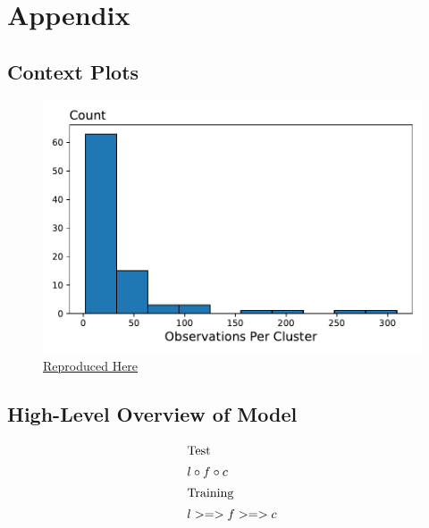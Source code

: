 \documentclass[a4paper,12pt]{article}
\begin{document}
%


\section{Appendix}
\subsection{Context Plots}
\begin{figure}[htbp]
\centering
\includegraphics[width=.5\linewidth]{figures/rtc/results/cceh/cluster_dist_False_False.pdf}
\caption{ \href{https://github.com/pharringtonp19/evictions/blob/main/scripts/cceh/primary/diff_n_mean_rrh.py}{Reproduced Here}}
\label{FIGURE LABEL}
\end{figure}
\subsection{High-Level Overview of Model}
\begin{align*}
\intertext{Test}
    &l \circ f \circ c \\ 
\intertext{Training} 
    &l >=> f >=> c \\ 
\end{align*}
\end{document}
